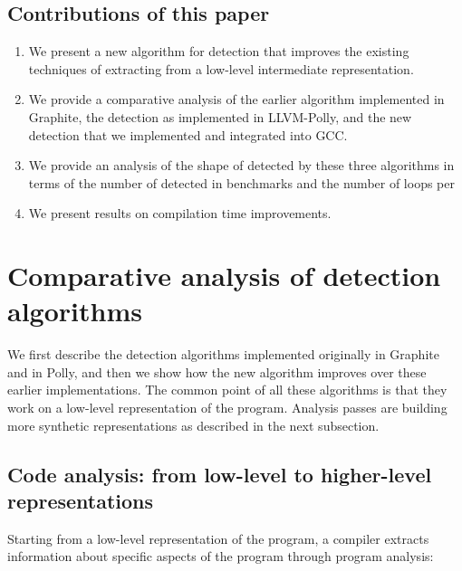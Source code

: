 \documentclass{sig-alternate}
\begin{document}
\subsection{Contributions of this paper}
\begin{enumerate}
  \item We present a new algorithm for \SCoP{} detection that improves the
    existing techniques of extracting  from a low-level intermediate
    representation.
  \item We provide a comparative analysis of the earlier algorithm implemented
    in Graphite, the \SCoP{} detection as implemented in LLVM-Polly, and the new
    \SCoP{} detection that we implemented and integrated into GCC.
  \item We provide an analysis of the shape of  detected by these three
    algorithms in terms of the number of  detected in benchmarks and the
    number of loops per 
  \item We present results on compilation time improvements.
\end{enumerate}

\section{Comparative analysis of \SCoP{} detection algorithms}

We first describe the \SCoP{} detection algorithms implemented originally in
Graphite and in Polly, and then we show how the new algorithm improves over
these earlier implementations.  The common point of all these algorithms is that
they work on a low-level representation of the program.  Analysis passes are
building more synthetic representations as described in the next subsection.

\subsection{Code analysis: from low-level to higher-level representations}

Starting from a low-level representation of the program, a compiler extracts
information about specific aspects of the program through program analysis:
\end{document}
